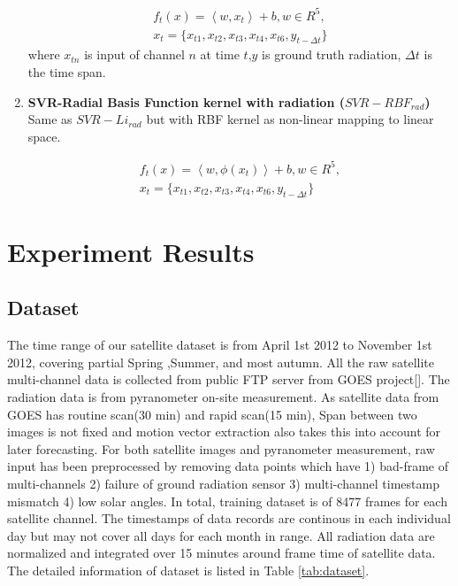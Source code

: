 \documentclass[conference]{IEEEtran}
\begin{document}
\begin{enumerate}
\begin{equation}
\begin{split}
f_{t}(x)=\left \langle w,x_{t} \right \rangle + b ,w
\in R^{5},\\
x_t=\{x_{t1},x_{t2},x_{t3},x_{t4},x_{t6},y_{t-\Delta t} \}
\end{split}
\end{equation}
where $x_{tn}$ is input of channel $n$ at time $t$,$y$ is ground truth
radiation, $\Delta t$ is the time span. 
\item \textbf{SVR-Radial Basis Function kernel with radiation ($SVR-RBF_{rad}$)}
Same as $SVR-Li_{rad}$ but with RBF kernel as non-linear mapping to linear
space.

\begin{equation}
\begin{split}
f_{t}(x)=\left \langle w,\phi(x_{t}) \right \rangle + b ,w
\in R^{5},\\
x_t=\{x_{t1},x_{t2},x_{t3},x_{t4},x_{t6},y_{t-\Delta t} \}
\end{split}
\end{equation}

\end{enumerate}


 
\section{Experiment Results} %
\label{sec:result}

\subsection{Dataset}
\label{subsec:dataset}
The time range of our satellite dataset is from April 1st 2012 to November 1st
2012, covering partial Spring ,Summer, and most autumn. All the raw satellite
multi-channel data is collected from public FTP server from GOES project[].
The radiation data is from pyranometer on-site measurement. As satellite data from GOES has
routine scan(30 min) and rapid scan(15 min), Span between two images is not
fixed and motion vector extraction also takes this into account for later
forecasting. For both satellite images and pyranometer measurement, raw input
has been preprocessed by removing data points which have 1) bad-frame of multi-channels
2) failure of ground radiation sensor 3) multi-channel timestamp mismatch 4) low
solar angles. In total, training dataset is of 8477 frames for each satellite
channel. The timestamps of data records are continous in each individual day
but may not cover all days for each month in range. All radiation data are
normalized and integrated over 15 minutes around frame time of satellite data.
The detailed information of dataset is listed in Table \ref{tab:dataset}.
\end{document}
